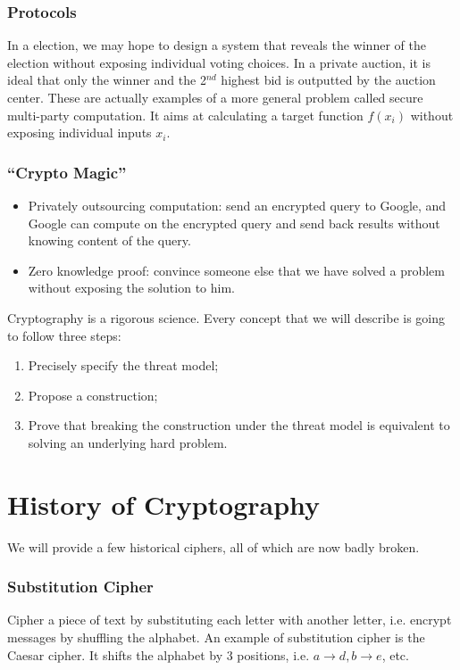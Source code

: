 \subsubsection{Protocols}
In a election, we may hope to design a system that reveals the winner of the election without exposing individual voting choices. In a private auction, it is ideal that only the winner and the 2$^{nd}$ highest bid is outputted by the auction center. These are actually examples of a more general problem called secure multi-party computation. It aims at calculating a target function $f(x_i)$ without exposing individual inputs $x_i$.
\subsubsection{``Crypto Magic''}
\begin{itemize}
\item Privately outsourcing computation: send an encrypted query to Google, and Google can compute on the encrypted query and send back results without knowing content of the query.
\item Zero knowledge proof: convince someone else that we have solved a problem without exposing the solution to him. 
\end{itemize}
Cryptography is a rigorous science. Every concept that we will describe is going to follow three steps: 
\begin{enumerate}
\item Precisely specify the threat model;
\item Propose a construction;
\item Prove that breaking the construction under the threat model is equivalent to solving an underlying hard problem.
\end{enumerate}

\section{History of Cryptography}
We will provide a few historical ciphers, all of which are now badly broken. 
\subsubsection{Substitution Cipher}
Cipher a piece of text by substituting each letter with another letter, i.e. encrypt messages by shuffling the alphabet. An example of substitution cipher is the Caesar cipher. It shifts the alphabet by 3 positions, i.e. $a\rightarrow d, b\rightarrow e$, etc. 

